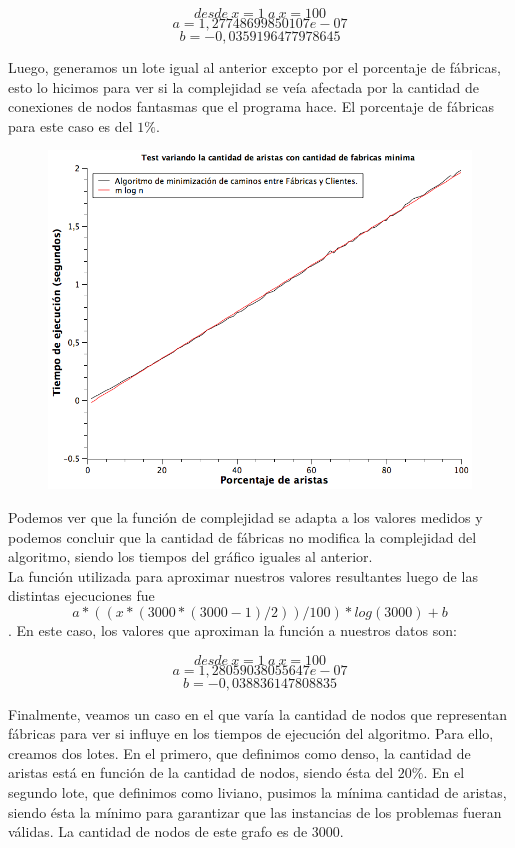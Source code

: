 $$desde\ x = 1\ a\ x = 100 $$
$$a  = 1,27748699850107e-07$$
$$b  = -0,0359196477978645 $$

\newpage
Luego, generamos un lote igual al anterior excepto por el porcentaje de fábricas, esto lo hicimos para ver si la complejidad se veía afectada por la cantidad de conexiones de nodos fantasmas que el programa hace. El porcentaje de fábricas para este caso es del $1\%$.

\begin{figure}[H]
\begin{center}
	\includegraphics[width=350pt]{../tests/ej3/EJ3-r-var-liviano.png}
\end{center}
\end{figure}

Podemos ver que la función de complejidad se adapta a los valores medidos y podemos concluir que la cantidad de fábricas no modifica la complejidad del algoritmo, siendo los tiempos del gráfico iguales al anterior.\\
La función utilizada para aproximar nuestros valores resultantes luego de las distintas ejecuciones fue $$ a*((x*(3000*(3000-1)/2))/100)*log(3000)+b$$.
En este caso, los valores que aproximan la función a nuestros datos son:

$$desde\ x = 1\ a\ x = 100$$
$$a  = 1,28059038055647e-07$$
$$b  = -0,038836147808835$$

\newpage 
Finalmente, veamos un caso en el que varía la cantidad de nodos que representan fábricas para ver si influye en los tiempos de ejecución del algoritmo. Para ello, creamos dos lotes. En el primero, que definimos como denso, la cantidad de aristas está en función de la cantidad de nodos, siendo ésta del $20\%$. En el segundo lote, que definimos como liviano, pusimos la mínima cantidad de aristas, siendo ésta la mínimo para garantizar que las instancias de los problemas fueran válidas. La cantidad de nodos de este grafo es de $3000$.

